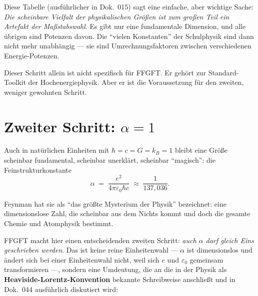 \begin{center}
\end{center}

Diese Tabelle (ausführlicher in Dok.~015) sagt eine einfache, aber wichtige
Sache: \emph{Die scheinbare Vielfalt der physikalischen Größen ist zum
großen Teil ein Artefakt der Maßstabswahl}. Es gibt nur eine fundamentale
Dimension, und alle übrigen sind Potenzen davon. Die ``vielen Konstanten''
der Schulphysik sind dann nicht mehr unabhängig --- sie sind
Umrechnungsfaktoren zwischen verschiedenen Energie-Potenzen.

Dieser Schritt allein ist nicht spezifisch für FFGFT. Er gehört zur
Standard-Toolkit der Hochenergiephysik. Aber er ist die Voraussetzung
für den zweiten, weniger gewohnten Schritt.

\section{Zweiter Schritt: $\alpha = 1$}

Auch in natürlichen Einheiten mit $\hbar = c = G = k_B = 1$ bleibt eine
Größe scheinbar fundamental, scheinbar unerklärt, scheinbar
``magisch'': die Feinstrukturkonstante
\[
  \alpha \;=\; \frac{e^{2}}{4\pi\varepsilon_{0}\hbar c} \;\approx\; \frac{1}{137{,}036}.
\]

Feynman hat sie als ``das größte Mysterium der Physik'' bezeichnet: eine
dimensionslose Zahl, die scheinbar aus dem Nichts kommt und doch die gesamte
Chemie und Atomphysik bestimmt.

FFGFT macht hier einen entscheidenden zweiten Schritt: \emph{auch $\alpha$
darf gleich Eins geschrieben werden}. Das ist keine reine Einheitenwahl
--- $\alpha$ ist dimensionslos und ändert sich bei einer Einheitenwahl
nicht, weil sich $e$ und $\varepsilon_{0}$ gemeinsam transformieren ---,
sondern eine Umdeutung, die an die in der Physik als
\textbf{Heaviside-Lorentz-Konvention} bekannte Schreibweise anschließt und
in Dok.~044 ausführlich diskutiert wird:

